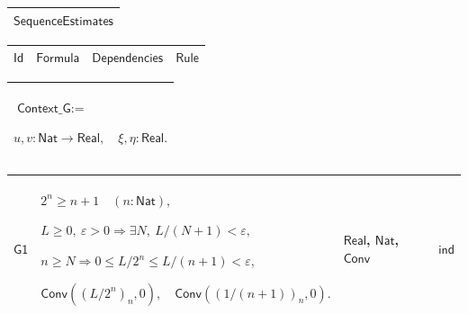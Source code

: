 \documentclass[11pt]{amsart}
\renewcommand{\arraystretch}{1.4}
\newlength{\FTCOneColumnBody}
\newlength{\FTCFourColumnBody}
\begin{document}
{\centering
\renewcommand{\arraystretch}{1.4}
\par\setlength{\parskip}{0pt}\nointerlineskip
\noindent
\begin{tabular}{|@{}>{\centering\arraybackslash}m{\FTCOneColumnBody}|}\hline
$\displaystyle \textsf{SequenceEstimates}$\\ \hline
\end{tabular}%
\par\setlength{\parskip}{0pt}\nointerlineskip
\noindent
\begin{tabular}{|@{}>{\centering\arraybackslash}m{0.078431\FTCFourColumnBody}|>{\centering\arraybackslash}m{0.535947\FTCFourColumnBody}|>{\centering\arraybackslash}m{0.281045\FTCFourColumnBody}|>{\centering\arraybackslash}m{0.104575\FTCFourColumnBody}|}\hline
$\displaystyle \textsf{Id}$ & $\displaystyle \textsf{Formula}$ & $\displaystyle \textsf{Dependencies}$ & $\displaystyle \textsf{Rule}$\\ \hline
\end{tabular}%
\par\setlength{\parskip}{0pt}\nointerlineskip
\noindent
\begin{tabular}{|@{}>{\centering\arraybackslash}m{\FTCOneColumnBody}|}\hline
$\displaystyle \textsf{Context\_G}:=$\par
$\displaystyle u,v:\textsf{Nat}\to\textsf{Real},\quad\xi,\eta:\textsf{Real}.$\\ \hline
\end{tabular}%
\par\setlength{\parskip}{0pt}\nointerlineskip
\noindent
\begin{tabular}{|@{}>{\centering\arraybackslash}m{0.078431\FTCFourColumnBody}|>{\centering\arraybackslash}m{0.535947\FTCFourColumnBody}|>{\centering\arraybackslash}m{0.281045\FTCFourColumnBody}|>{\centering\arraybackslash}m{0.104575\FTCFourColumnBody}|}\hline
\hypertarget{proof:G1}{$\displaystyle \textsf{G1}$} & $\displaystyle 2^n\ge n+1\quad(n:\textsf{Nat}),$\par
$\displaystyle L\ge0,\ \varepsilon>0\Rightarrow\exists N,\ L/(N+1)<\varepsilon,$\par
$\displaystyle n\ge N\Rightarrow0\le L/2^n\le L/(n+1)<\varepsilon,$\par
$\displaystyle \textsf{Conv}((L/2^n)_n,0),\quad\textsf{Conv}((1/(n+1))_n,0).$ & \hyperlink{ax:Real}{$\displaystyle \textsf{Real}$}, \hyperlink{ax:Nat}{$\displaystyle \textsf{Nat}$}, \hyperlink{def:Conv}{$\displaystyle \textsf{Conv}$} & $\displaystyle \textsf{ind}$\\ \hline

\end{tabular}}
\end{document}
